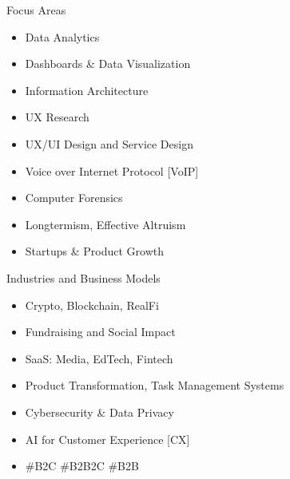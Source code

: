

Focus Areas %
\vspace*{-0.8em}
\begin{itemize}
 \setlength\itemsep{-0.3em}
\item Data Analytics
\item Dashboards \& Data Visualization
\item Information Architecture
\item UX Research
\item UX/UI Design and Service Design
\item Voice over Internet Protocol [VoIP]
\item Computer Forensics
\item Longtermism, Effective Altruism
\item Startups \& Product Growth
\end{itemize}

Industries and Business Models
\vspace*{-0.8em}
\begin{itemize}
 \setlength\itemsep{-0.3em}
\item Crypto, Blockchain, RealFi
\item Fundraising and Social Impact %
\item SaaS: Media, EdTech, Fintech
\item Product Transformation, Task Management Systems
\item Cybersecurity \& Data Privacy
\item AI for Customer Experience [CX]
\item \#B2C \#B2B2C \#B2B
\end{itemize}


